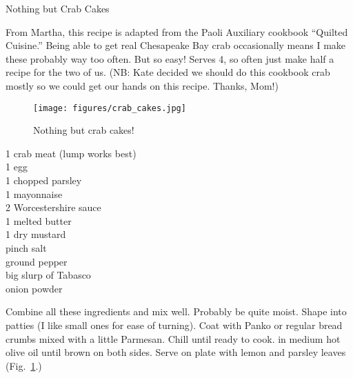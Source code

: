 \begin{entry}{Nothing but Crab Cakes}

\begin{open}
  From Martha, this recipe is adapted from the Paoli Auxiliary cookbook
  ``Quilted Cuisine.'' Being able to get real Chesapeake Bay crab occasionally
  means I make these probably way too often. But so easy! Serves 4, so often
  just make half a recipe for the two of us. (NB: Kate decided we should do
  this cookbook crab mostly so we could get our hands on this recipe. Thanks,
  Mom!)
\end{open}
\begin{figure}
    \centering
    \texttt{[image: figures/crab\_cakes.jpg]}
    \caption{Nothing but crab cakes!}
    \label{fig:crab-cakes}
\end{figure}
\begin{ingredients}
    \SI{1}{\pound} crab meat (lump works best)\\
    1 egg\\
    \SI{1}{\tblspoon} chopped parsley\\
    \SI{1}{\tblspoon} mayonnaise\\
    \SI{2}{\teaspoon} Worcestershire sauce\\
    \SI{1}{\tblspoon} melted butter\\
    \SI{1}{\teaspoon} dry mustard \\
    pinch salt\\
    ground pepper\\
    big slurp of Tabasco\\
    onion powder
\end{ingredients}
Combine all these ingredients and mix well. Probably be quite moist. Shape
into patties (I like small ones for ease of turning). Coat with Panko or
regular bread crumbs mixed with a little Parmesan. Chill until ready to
cook. \Saute in medium hot olive oil until brown on both sides.  Serve on plate with lemon and parsley leaves (Fig.~\ref{fig:crab-cakes}.)
\end{entry}

